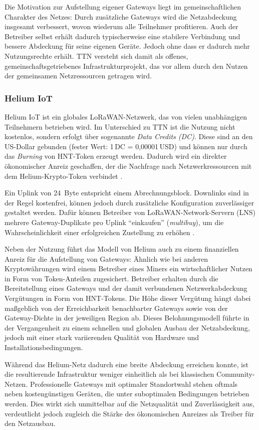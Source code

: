 Die Motivation zur Aufstellung eigener Gateways liegt im gemeinschaftlichen Charakter des Netzes: Durch zusätzliche Gateways wird die Netzabdeckung insgesamt verbessert, wovon wiederum alle Teilnehmer profitieren. Auch der Betreiber selbst erhält dadurch typischerweise eine stabilere Verbindung und bessere Abdeckung für seine eigenen Geräte. Jedoch ohne dass er dadurch mehr Nutzungsrechte erhält. TTN versteht sich damit als offenes, gemeinschaftsgetriebenes Infrastrukturprojekt, das vor allem durch den Nutzen der gemeinsamen Netzressourcen getragen wird.

\subsubsection*{Helium IoT}
Helium IoT ist ein globales LoRaWAN-Netzwerk, das von vielen unabhängigen Teilnehmern betrieben wird. Im Unterschied zu TTN ist die Nutzung nicht kostenlos, sondern erfolgt über sogenannte \emph{Data Credits (DC)}. Diese sind an den US-Dollar gebunden (fester Wert: 1\,DC = 0{,}00001\,USD) und können nur durch das \emph{Burning} von HNT-Token erzeugt werden. Dadurch wird ein direkter ökonomischer Anreiz geschaffen, der die Nachfrage nach Netzwerkressourcen mit dem Helium-Krypto-Token verbindet \autocite{HeliumDC}. 

Ein Uplink von 24~Byte entspricht einem Abrechnungsblock. Downlinks sind in der Regel kostenfrei, können jedoch durch zusätzliche Konfiguration zuverlässiger gestaltet werden. Dafür können Betreiber von LoRaWAN-Network-Servern (LNS) mehrere Gateway-Duplikate pro Uplink \enquote{einkaufen} (\emph{multibuy}), um die Wahrscheinlichkeit einer erfolgreichen Zustellung zu erhöhen \autocite{HeliumLNSAdv}.  

Neben der Nutzung führt das Modell von Helium auch zu einem finanziellen Anreiz für die Aufstellung von Gateways: Ähnlich wie bei anderen Kryptowährungen wird einem Betreiber eines Miners ein wirtschaftlicher Nutzen in Form von Token-Anteilen zugesichert. Betreiber erhalten durch die Bereitstellung eines Gateways und der damit verbundenen Netzwerkabdeckung Vergütungen in Form von HNT-Tokens. Die Höhe dieser Vergütung hängt dabei maßgeblich von der Erreichbarkeit benachbarter Gateways sowie von der Gateway-Dichte in der jeweiligen Region ab. Dieses Belohnungsmodell führte in der Vergangenheit zu einem schnellen und globalen Ausbau der Netzabdeckung, jedoch mit einer stark variierenden Qualität von Hardware und Installationsbedingungen.  

Während das Helium-Netz dadurch eine breite Abdeckung erreichen konnte, ist die resultierende Infrastruktur weniger einheitlich als bei klassischen Community-Netzen. Professionelle Gateways mit optimaler Standortwahl stehen oftmals neben kostengünstigen Geräten, die unter suboptimalen Bedingungen betrieben werden. Dies wirkt sich unmittelbar auf die Netzqualität und Zuverlässigkeit aus, verdeutlicht jedoch zugleich die Stärke des ökonomischen Anreizes als Treiber für den Netzausbau.

